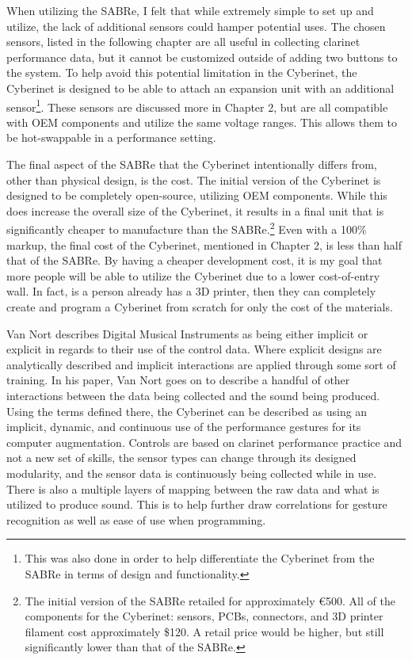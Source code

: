 When utilizing the SABRe, I felt that while extremely simple to set up and utilize, the lack of additional sensors could hamper potential uses. The chosen sensors, listed in the following chapter are all useful in collecting clarinet performance data, but it cannot be customized outside of adding two buttons to the system. To help avoid this potential limitation in the Cyberinet, the Cyberinet is designed to be able to attach an expansion unit with an additional sensor\footnote{This was also done in order to help differentiate the Cyberinet from the SABRe in terms of design and functionality.}. These sensors are discussed more in Chapter 2, but are all compatible with OEM components and utilize the same voltage ranges. This allows them to be hot-swappable in a performance setting.

The final aspect of the SABRe that the Cyberinet intentionally differs from, other than physical design, is the cost. The initial version of the Cyberinet is designed to be completely open-source, utilizing OEM components. While this does increase the overall size of the Cyberinet, it results in a final unit that is significantly cheaper to manufacture than the SABRe.\footnote{The initial version of the SABRe retailed for approximately €500. All of the components for the Cyberinet: sensors, PCBs, connectors, and 3D printer filament cost approximately \$120. A retail price would be higher, but still significantly lower than that of the SABRe.} Even with a 100\% markup, the final cost of the Cyberinet, mentioned in Chapter 2, is less than half that of the SABRe. By having a cheaper development cost, it is my goal that more people will be able to utilize the Cyberinet due to a lower cost-of-entry wall. In fact, is a person already has a 3D printer, then they can completely create and program a Cyberinet from scratch for only the cost of the materials.


Van Nort describes Digital Musical Instruments as being either implicit or explicit in regards to their use of the control data. Where explicit designs are analytically described and implicit interactions are applied through some sort of training\cite{vanNortMapping2007}. In his paper, Van Nort goes on to describe a handful of other interactions between the data being collected and the sound being produced. Using the terms defined there, the Cyberinet can be described as using an implicit, dynamic, and continuous use of the performance gestures for its computer augmentation. Controls are based on clarinet performance practice and not a new set of skills, the sensor types can change through its designed modularity, and the sensor data is continuously being collected while in use. There is also a multiple layers of mapping between the raw data and what is utilized to produce sound. This is to help further draw correlations for gesture recognition as well as ease of use when programming.

